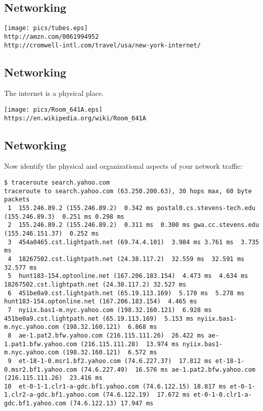 \documentclass[xga]{xdvislides}
\begin{document}
\subsection{Networking}
\begin{center}
\vspace*{\fill}
	\texttt{[image: pics/tubes.eps]} \\
\vspace*{\fill}
{\tt http://amzn.com/0061994952} \\
{\tt http://cromwell-intl.com/travel/usa/new-york-internet/}
\end{center}

\subsection{Networking}
The internet is a physical place. \\
\begin{center}
\vspace*{\fill}
	\texttt{[image: pics/Room\_641A.eps]} \\
\vspace*{\fill}
{\tt https://en.wikipedia.org/wiki/Room\_641A}
\end{center}

\subsection{Networking}
Now identify the physical and organizational aspects
of your network traffic:

\begin{verbatim}
$ traceroute search.yahoo.com
traceroute to search.yahoo.com (63.250.200.63), 30 hops max, 60 byte packets
 1  155.246.89.2 (155.246.89.2)  0.342 ms postal0.cs.stevens-tech.edu (155.246.89.3)  0.251 ms 0.298 ms
 2  155.246.89.2 (155.246.89.2)  0.311 ms  0.300 ms gwa.cc.stevens.edu (155.246.151.37)  0.252 ms
 3  454a0465.cst.lightpath.net (69.74.4.101)  3.984 ms 3.761 ms  3.735 ms
 4  18267502.cst.lightpath.net (24.38.117.2)  32.559 ms  32.591 ms  32.577 ms
 5  hunt183-154.optonline.net (167.206.183.154)  4.473 ms  4.634 ms 18267502.cst.lightpath.net (24.38.117.2) 32.527 ms
 6  451be0a9.cst.lightpath.net (65.19.113.169)  5.170 ms  5.278 ms hunt183-154.optonline.net (167.206.183.154)  4.465 ms
 7  nyiix.bas1-m.nyc.yahoo.com (198.32.160.121)  6.928 ms 451be0a9.cst.lightpath.net (65.19.113.169)  5.153 ms nyiix.bas1-m.nyc.yahoo.com (198.32.160.121)  6.868 ms
 8  ae-1.pat2.bfw.yahoo.com (216.115.111.26)  26.422 ms ae-1.pat1.bfw.yahoo.com (216.115.111.28)  13.974 ms nyiix.bas1-m.nyc.yahoo.com (198.32.160.121)  6.572 ms
 9  et-18-1-0.msr1.bf2.yahoo.com (74.6.227.37)  17.812 ms et-18-1-0.msr2.bf1.yahoo.com (74.6.227.49)  16.576 ms ae-1.pat2.bfw.yahoo.com (216.115.111.26)  23.416 ms
10  et-0-1-1.clr1-a-gdc.bf1.yahoo.com (74.6.122.15) 18.817 ms et-0-1-1.clr2-a-gdc.bf1.yahoo.com (74.6.122.19)  17.672 ms et-0-1-0.clr1-a-gdc.bf1.yahoo.com (74.6.122.13) 17.947 ms
\end{verbatim}
\end{document}
